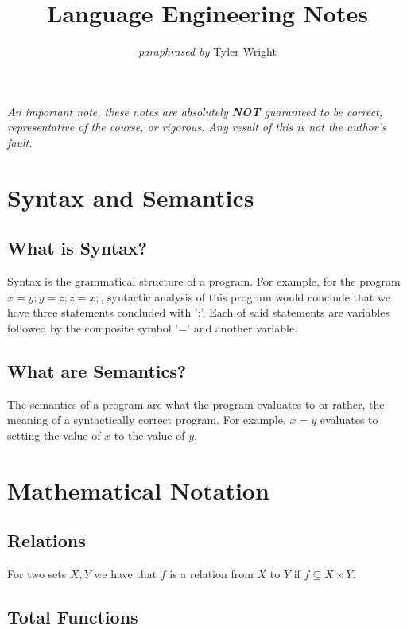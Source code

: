 \documentclass[a4paper, 12pt, twoside]{article}
\begin{document}
\title{Language Engineering Notes}
\date{}
\author{\textit{paraphrased by} Tyler Wright}
\maketitle

\vfill

\textit{An important note, these notes are absolutely \textbf{NOT}
  guaranteed to be correct, representative of the course, or rigorous.
  Any result of this is not the author's fault.}

\newpage

\section{Syntax and Semantics}

\subsection{What is Syntax?}

Syntax is the grammatical structure of a program. For example,
for the program $x=y;y=z;z=x;$, syntactic analysis of this 
program would conclude that we have three statements concluded
with ';'. Each of said statements are variables followed by
the composite symbol '=' and another variable.

\subsection{What are Semantics?}

The semantics of a program are what the program evaluates
to or rather, the meaning of a syntactically correct program.
For example, $x=y$ evaluates to setting the value of $x$ to the 
value of $y$.

\section{Mathematical Notation}

\subsection{Relations}

For two sets $X, Y$ we have that $f$ is a relation from $X$ to $Y$ if
$f \subseteq X \times Y$.

\subsection{Total Functions}
\end{document}
